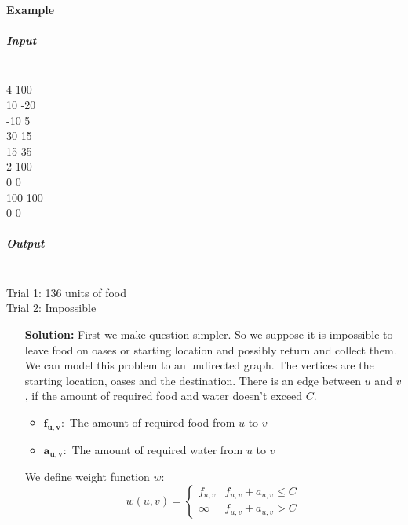\documentclass{book}
\begin{document}
\begin{enumerate}
\begin{enumerate}
		\paragraph{Example}
		\subparagraph{Input} \mbox{}\\
		4 100\\
		10 -20\\
		-10 5\\
		30 15\\
		15 35\\
		2 100\\
		0 0\\
		100 100\\
		0 0
		\subparagraph{Output} \mbox{}\\
		Trial 1: 136 units of food\\
		Trial 2: Impossible\\
		\begin{itemize}
			\item[\textbf{Solution:}] First we make question simpler. So we suppose it is impossible to leave food on oases or starting location and possibly return and collect them.\\
            We can model this problem to an undirected graph. The vertices are the starting location, oases and the destination. There is an edge between $u$ and $v$, if the amount of required food and water doesn't exceed $C$.
            \begin{itemize}
                    \item $\boldsymbol{f_{u, v}:}$ The amount of required food from $u$ to $v$
                    \item $\boldsymbol{a_{u, v}:}$ The amount of required water from $u$ to $v$
            \end{itemize}
            We define weight function $w$:
            \begin{equation*}
                    w(u, v) = \begin{cases}
                    f_{u, v} & f_{u, v} + a_{u, v} \le C \\
                    \infty & f_{u, v} + a_{u, v} > C
                    \end{cases}
            \end{equation*}

\end{itemize}
\end{enumerate}
\end{enumerate}
\end{document}
